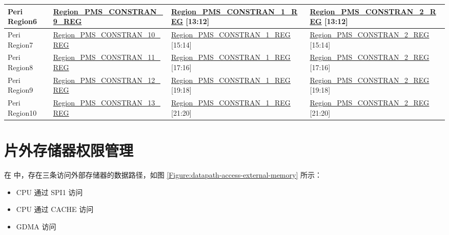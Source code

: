 \documentclass[main\_\_CN.tex]{subfiles}
\begin{document}
\begin{table}[H]
\begin{tabular}{ | l | l | l | l |}
        Peri Region6 & \scriptsize{\hyperref[regdesc:PMSCORE0REGIONPMSCONSTRAIN3REG]{Region\_PMS\_CONSTRAN\_9\_REG}} & \scriptsize{\hyperref[regdesc:PMSCORE0REGIONPMSCONSTRAIN1REG]{Region\_PMS\_CONSTRAN\_1\_REG} [13:12]} & \scriptsize{\hyperref[regdesc:PMSCORE0REGIONPMSCONSTRAIN1REG]{Region\_PMS\_CONSTRAN\_2\_REG} [13:12]}\\\hline
        Peri Region7 & \scriptsize{\hyperref[regdesc:PMSCORE0REGIONPMSCONSTRAIN3REG]{Region\_PMS\_CONSTRAN\_10\_REG}} & \scriptsize{\hyperref[regdesc:PMSCORE0REGIONPMSCONSTRAIN1REG]{Region\_PMS\_CONSTRAN\_1\_REG} [15:14]} & \scriptsize{\hyperref[regdesc:PMSCORE0REGIONPMSCONSTRAIN1REG]{Region\_PMS\_CONSTRAN\_2\_REG} [15:14]}\\\hline
        Peri Region8 & \scriptsize{\hyperref[regdesc:PMSCORE0REGIONPMSCONSTRAIN3REG]{Region\_PMS\_CONSTRAN\_11\_REG}} & \scriptsize{\hyperref[regdesc:PMSCORE0REGIONPMSCONSTRAIN1REG]{Region\_PMS\_CONSTRAN\_1\_REG} [17:16]} & \scriptsize{\hyperref[regdesc:PMSCORE0REGIONPMSCONSTRAIN1REG]{Region\_PMS\_CONSTRAN\_2\_REG} [17:16]}\\\hline
        Peri Region9 & \scriptsize{\hyperref[regdesc:PMSCORE0REGIONPMSCONSTRAIN3REG]{Region\_PMS\_CONSTRAN\_12\_REG}} & \scriptsize{\hyperref[regdesc:PMSCORE0REGIONPMSCONSTRAIN1REG]{Region\_PMS\_CONSTRAN\_1\_REG} [19:18]} & \scriptsize{\hyperref[regdesc:PMSCORE0REGIONPMSCONSTRAIN1REG]{Region\_PMS\_CONSTRAN\_2\_REG} [19:18]}\\\hline
        Peri Region10 & \scriptsize{\hyperref[regdesc:PMSCORE0REGIONPMSCONSTRAIN3REG]{Region\_PMS\_CONSTRAN\_13\_REG}} & \scriptsize{\hyperref[regdesc:PMSCORE0REGIONPMSCONSTRAIN1REG]{Region\_PMS\_CONSTRAN\_1\_REG} [21:20]} & \scriptsize{\hyperref[regdesc:PMSCORE0REGIONPMSCONSTRAIN1REG]{Region\_PMS\_CONSTRAN\_2\_REG} [21:20]}\\\hline
    \end{tabular}
\end{table}

\section{片外存储器权限管理}

在 \chipname{} 中，存在三条访问外部存储器的数据路径，如图 \ref{Figure:datapath-access-external-memory} 所示：

\begin{itemize}
    \item CPU 通过 SPI1 访问
    \item CPU 通过 CACHE 访问
    \item GDMA 访问


\end{itemize}
\end{document}
